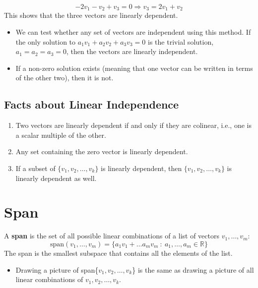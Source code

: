 \documentclass[10pt]{article}
\begin{document}
\[-2 v_1 - v_2 + v_3 = 0 \Rightarrow v_3 = 2v_1 + v_2\]
This shows that the three vectors are linearly dependent.
\begin{itemize}
	\item We can test whether any set of vectors are independent using this method.  If the only solution to $a_1 v_1 + a_2 v_2 + a_3 v_3 = 0$ is the trivial solution, $a_1 = a_2 = a_3 = 0$, then the vectors are linearly independent.
	\item If a non-zero solution exists (meaning that one vector can be written in terms of the other two), then it is not.
\end{itemize}

\subsection*{Facts about Linear Independence}
\begin{enumerate}
	\item Two vectors are linearly dependent if and only if they are colinear, i.e., one is a scalar multiple of the other.
	\item Any set containing the zero vector is linearly dependent.
	\item If a subset of $\{v_1, v_2, \dots, v_k\}$ is linearly dependent, then $\{v_1, v_2, \dots, v_k\}$ is linearly dependent as well.
\end{enumerate}

\section*{Span}
A \textbf{span} is the set of all possible linear combinations of a list of vectors $v_1, \dots, v_m$:
\[\text{span}(v_1, \dots, v_m) = \{a_1 v_1 + \dots a_m v_m \::\: a_1, \dots, a_m \in \mathbb{R}\}\]
The span is the smallest subspace that contains all the elements of the list.
\begin{itemize}
	\item Drawing a picture of span\{$v_1, v_2, \dots, v_k$\} is the same as drawing a picture of all linear combinations of $v_1, v_2, \dots, v_k$.
\end{itemize}
\end{document}
